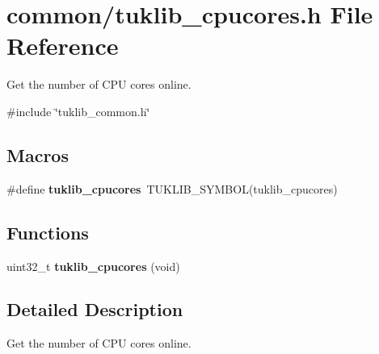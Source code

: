 \section{common/tuklib\+\_\+cpucores.h File Reference}
\label{tuklib__cpucores_8h}


Get the number of C\+PU cores online.  


{\ttfamily \#include \char`\"{}tuklib\+\_\+common.\+h\char`\"{}}\newline
\subsection*{Macros}
\begin{DoxyCompactItemize}
\item 
\mbox{\label{tuklib__cpucores_8h_a27a9b6df2fabc7a8bf6dd06630da9843}} 
\#define {\bfseries tuklib\+\_\+cpucores}~T\+U\+K\+L\+I\+B\+\_\+\+S\+Y\+M\+B\+OL(tuklib\+\_\+cpucores)
\end{DoxyCompactItemize}
\subsection*{Functions}
\begin{DoxyCompactItemize}
\item 
\mbox{\label{tuklib__cpucores_8h_a29a46012d8b74be2f52214798c17dd79}} 
uint32\+\_\+t {\bfseries tuklib\+\_\+cpucores} (void)
\end{DoxyCompactItemize}


\subsection{Detailed Description}
Get the number of C\+PU cores online. 

